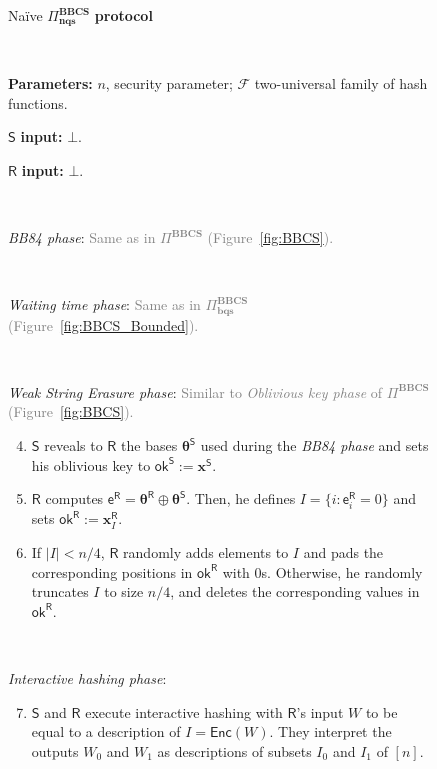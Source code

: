 \begin{figure}[h!]
\centering
\begin{tcolorbox}
                        
    \centerline{Na\"ive $\Pi^{\textbf{BBCS}}_{\textbf{nqs}}$ \textbf{protocol}}
            
    \
    
    \textbf{Parameters:} $n$, security parameter; $\mathcal{F}$ two-universal family of hash functions.
    
    $\mathsf{S}$ \textbf{input:} $\bot$.  
    
    $\mathsf{R}$ \textbf{input:} $\bot$. 
    
    \
    
    \textit{BB84 phase}: \textcolor{gray}{Same as in $\Pi^{\textbf{BBCS}}$ (Figure~\ref{fig:BBCS}).}
    
    
    \
    
    \textit{Waiting time phase}: \textcolor{gray}{Same as in $\Pi^{\textbf{BBCS}}_{\textbf{bqs}}$ (Figure~\ref{fig:BBCS_Bounded}).}
    
    \
    
    \textit{Weak String Erasure phase}: \textcolor{gray}{Similar to \textit{Oblivious key phase} of $\Pi^{\textbf{BBCS}}$ (Figure~\ref{fig:BBCS}).}
    \begin{enumerate}
        \setcounter{enumi}{3}
        \item $\mathsf{S}$ reveals to $\mathsf{R}$ the bases $\bm{\theta}^{\mathsf{S}}$ used during the \textit{BB84 phase} and sets his oblivious key to $\mathsf{ok}^{\mathsf{S}}:=\bm{x}^{\mathsf{S}}$.
        
        \item $\mathsf{R}$ computes $\mathsf{e}^\mathsf{R} = \bm{\theta}^{\mathsf{R}} \oplus \bm{\theta}^{\mathsf{S}}$. Then, he defines $I = \{ i : \mathsf{e}^{\mathsf{R}}_i = 0 \}$ and sets $\mathsf{ok}^{\mathsf{R}}:=\bm{x}^{\mathsf{R}}_{I}$.
        
        \item If $|I| < n/4$, $\mathsf{R}$ randomly adds elements to $I$ and pads the corresponding positions in $\mathsf{ok}^{\mathsf{R}}$ with $0$s. Otherwise, he randomly truncates $I$ to size $n/4$, and deletes the corresponding values in $\mathsf{ok}^{\mathsf{R}}$.
    \end{enumerate}
     
    \ 
     
    \textit{Interactive hashing phase}: 
    \begin{enumerate}
        \setcounter{enumi}{6}
        \item $\mathsf{S}$ and $\mathsf{R}$ execute interactive hashing with $\mathsf{R}$’s input $W$ to be equal to a description of $I = \mathsf{Enc}(W)$. They interpret the outputs $W_0$ and $W_1$ as descriptions of subsets $I_0$ and $I_1$ of $[n]$.
    \end{enumerate}
    

\end{tcolorbox}
\end{figure}

